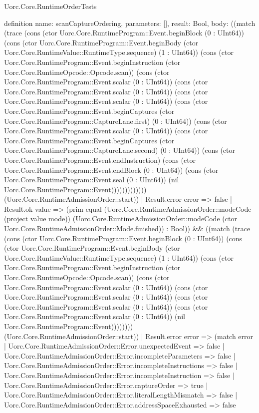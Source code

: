 \begin{lexlean}{Uorc.Core.RuntimeOrderTests}
\begin{semanticmodule}
definition{
  name: scanCaptureOrdering,
  parameters: [],
  result: Bool,
  body: ((match (trace (cons (ctor Uorc.Core.RuntimeProgram::Event.beginBlock (0 : UInt64)) (cons (ctor Uorc.Core.RuntimeProgram::Event.beginBody (ctor Uorc.Core.RuntimeValue::RuntimeType.sequence) (1 : UInt64)) (cons (ctor Uorc.Core.RuntimeProgram::Event.beginInstruction (ctor Uorc.Core.RuntimeOpcode::Opcode.scan)) (cons (ctor Uorc.Core.RuntimeProgram::Event.scalar (0 : UInt64)) (cons (ctor Uorc.Core.RuntimeProgram::Event.scalar (0 : UInt64)) (cons (ctor Uorc.Core.RuntimeProgram::Event.scalar (0 : UInt64)) (cons (ctor Uorc.Core.RuntimeProgram::Event.beginCaptures (ctor Uorc.Core.RuntimeProgram::CaptureLane.first) (0 : UInt64)) (cons (ctor Uorc.Core.RuntimeProgram::Event.scalar (0 : UInt64)) (cons (ctor Uorc.Core.RuntimeProgram::Event.beginCaptures (ctor Uorc.Core.RuntimeProgram::CaptureLane.second) (0 : UInt64)) (cons (ctor Uorc.Core.RuntimeProgram::Event.endInstruction) (cons (ctor Uorc.Core.RuntimeProgram::Event.endBlock (0 : UInt64)) (cons (ctor Uorc.Core.RuntimeProgram::Event.seal (0 : UInt64)) (nil Uorc.Core.RuntimeProgram::Event))))))))))))) (Uorc.Core.RuntimeAdmissionOrder::start))
    | Result.error error => false
    | Result.ok value => (prim equal (Uorc.Core.RuntimeAdmissionOrder::modeCode (project value mode)) (Uorc.Core.RuntimeAdmissionOrder::modeCode (ctor Uorc.Core.RuntimeAdmissionOrder::Mode.finished)) : Bool)) && ((match (trace (cons (ctor Uorc.Core.RuntimeProgram::Event.beginBlock (0 : UInt64)) (cons (ctor Uorc.Core.RuntimeProgram::Event.beginBody (ctor Uorc.Core.RuntimeValue::RuntimeType.sequence) (1 : UInt64)) (cons (ctor Uorc.Core.RuntimeProgram::Event.beginInstruction (ctor Uorc.Core.RuntimeOpcode::Opcode.scan)) (cons (ctor Uorc.Core.RuntimeProgram::Event.scalar (0 : UInt64)) (cons (ctor Uorc.Core.RuntimeProgram::Event.scalar (0 : UInt64)) (cons (ctor Uorc.Core.RuntimeProgram::Event.scalar (0 : UInt64)) (cons (ctor Uorc.Core.RuntimeProgram::Event.scalar (0 : UInt64)) (nil Uorc.Core.RuntimeProgram::Event)))))))) (Uorc.Core.RuntimeAdmissionOrder::start))
    | Result.error error => (match error
      | Uorc.Core.RuntimeAdmissionOrder::Error.unexpectedEvent => false
      | Uorc.Core.RuntimeAdmissionOrder::Error.incompleteParameters => false
      | Uorc.Core.RuntimeAdmissionOrder::Error.incompleteInstructions => false
      | Uorc.Core.RuntimeAdmissionOrder::Error.incompleteInstruction => false
      | Uorc.Core.RuntimeAdmissionOrder::Error.captureOrder => true
      | Uorc.Core.RuntimeAdmissionOrder::Error.literalLengthMismatch => false
      | Uorc.Core.RuntimeAdmissionOrder::Error.addressSpaceExhausted => false
}
\end{semanticmodule}
\end{lexlean}
